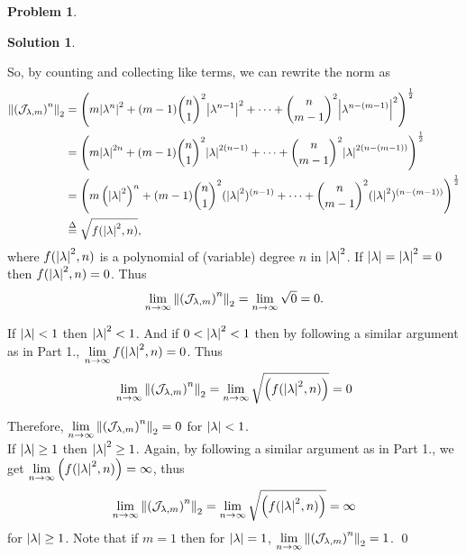 \documentclass{book}
\theoremstyle{definition}
\newtheorem*{prob*}{Problem}
\newtheorem*{sln*}{Solution}
\newcommand{\jor}{\mathcal{J}}
\begin{document}
\begin{prob*}
\begin{sln*}
\begin{enumerate}
			So, by counting and collecting like terms, we can rewrite the norm as	
			\begin{align*}
			\norm{\left(\jor_{\lambda,m}\right)^n}_2 &= \left(m\abs{ \lambda^n}^2  + (m-1){n\choose 1}^2\abs{\lambda^{n-1}}^2 + \dots +  {n\choose m-1}^2\abs{  \lambda^{n-(m-1)}}^2   \right)^\frac{1}{2}\\
			&= \left( m\abs{\lambda}^{2n}  + (m-1){n\choose 1}^2\abs{\lambda}^{2(n-1)} + \dots + {n\choose m-1}^2\abs{  \lambda}^{2(n-(m-1))}  \right)^\frac{1}{2}\\
			&= \left( m\left(\abs{\lambda}^{2}\right)^n  + (m-1){n\choose 1}^2(\abs{\lambda}^{2})^{(n-1)} + \dots + {n\choose m-1}^2(\abs{  \lambda}^{2})^{(n-(m-1))}  \right)^\frac{1}{2}\\
			&\stackrel{\Delta}{=} \sqrt{f(\abs{\lambda}^2, n)},
			\end{align*}
			where $f(\abs{\lambda}^2, n)$ is a polynomial of (variable) degree $n$ in $\abs{\lambda}^2$. If $\abs{\lambda} = \abs{\lambda}^2 = 0$ then $ f(\abs{\lambda}^2, n) = 0 $. Thus  
			\begin{align*}
			\lim\limits_{n\to \infty}\norm{\left(\jor_{\lambda,m}\right)^n}_2 = \lim\limits_{n\to \infty}\sqrt{0} = 0.
			\end{align*}
			
			If $\abs{\lambda}< 1$ then $\abs{\lambda}^2< 1$. And if $0 <  \abs{\lambda}^2< 1$ then by following a similar argument as in Part 1., $\lim\limits_{n\to\infty} f(\abs{\lambda}^2, n) = 0$. Thus 
			\begin{align*}
			\lim\limits_{n\to \infty}\norm{\left(\jor_{\lambda,m}\right)^n}_2  = \lim\limits_{n\to\infty}\sqrt{\left(f(\abs{\lambda}^2, n)\right)}= 0
			\end{align*}
			
			Therefore, $\lim\limits_{n\to \infty}\norm{\left(\jor_{\lambda,m}\right)^n}_2 = 0$ for $\abs{\lambda} < 1$.\\
			
			If $\abs{\lambda} \geq 1$ then $\abs{\lambda}^2 \geq 1$. Again, by following a similar argument as in Part 1., we get   $\lim\limits_{n\to\infty} \left( f(\abs{\lambda}^2,n ) \right) = \infty$, thus
			\begin{align*}
			\lim\limits_{n\to \infty}\norm{\left(\jor_{\lambda,m}\right)^n}_2 = \lim\limits_{n\to\infty}\sqrt{\left(f(\abs{\lambda}^2,n)\right)} = \infty
			\end{align*}
			for $\abs{\lambda} \geq 1$. Note that if $m=1$ then for $\abs{  \lambda} = 1$, $\lim\limits_{n\to \infty}\norm{\left(\jor_{\lambda,m}\right)^n}_2 = 1$.  	  \qed
		\end{enumerate}
	\end{sln*}

\end{prob*}
\end{document}
